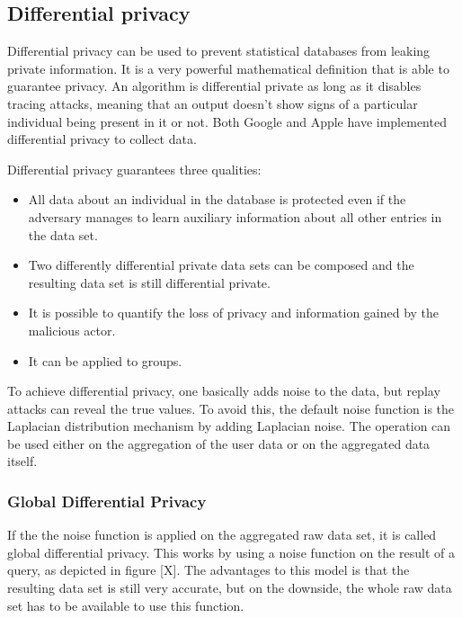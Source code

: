\subsection{Differential privacy}
Differential privacy can be used to prevent statistical databases from leaking private information. It is a very powerful mathematical definition that is able to guarantee privacy. An algorithm is differential private as long as it disables tracing attacks, meaning that an output doesn't show signs of a particular individual being present in it or not. Both Google and Apple have implemented differential privacy to collect data.

Differential privacy guarantees three qualities:
\begin{itemize}
	\item All data about an individual in the database is protected even if the adversary manages to learn auxiliary information about all other entries in the data set.
	\item Two differently differential private data sets can be composed and the resulting data set is still differential private.
	\item It is possible to quantify the loss of privacy and information gained by the malicious actor.
	\item It can be applied to groups.
\end{itemize}

To achieve differential privacy, one basically adds noise to the data, but replay attacks can reveal the true values. To avoid this, the default noise function is the Laplacian distribution mechanism by adding Laplacian noise. The operation can be used either on the aggregation of the user data or on the aggregated data itself.

\subsubsection{Global Differential Privacy}

If the the noise function is applied on the aggregated raw data set, it is called global differential privacy. This works by using a noise function on the result of a query, as depicted in figure [X]. The advantages to this model is that the resulting data set is still very accurate, but on the downside, the whole raw data set has to be available to use this function.

